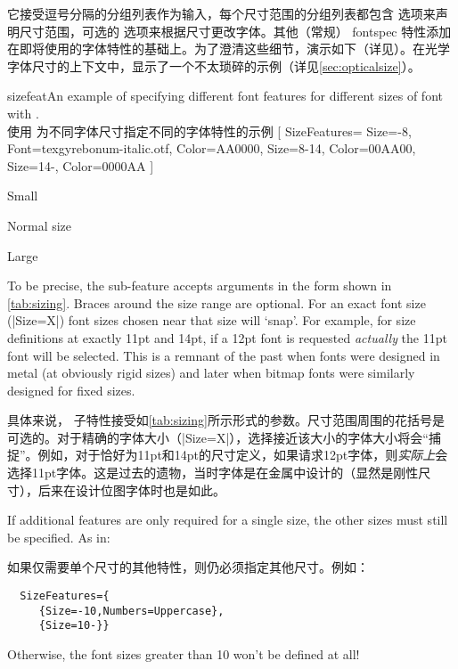 \documentclass[a4paper]{l3doc}
\begin{document}
它接受逗号分隔的分组列表作为输入，每个尺寸范围的分组列表都包含  选项来声明尺寸范围，可选的  选项来根据尺寸更改字体。其他（常规） fontspec 特性添加在即将使用的字体特性的基础上。为了澄清这些细节，演示如下（详见）。在光学字体尺寸的上下文中，显示了一个不太琐碎的示例（详见\vref{sec:opticalsize}）。


\begin{Xexample}{sizefeat}{An example of specifying different font features for different sizes of font with .\\使用  为不同字体尺寸指定不同的字体特性的示例}
  [
    SizeFeatures={
      {Size={-8}, Font=texgyrebonum-italic.otf, Color=AA0000},
      {Size={8-14}, Color=00AA00},
      {Size={14-}, Color=0000AA}} ]

  {\scriptsize Small\par} Normal size\par {\Large Large\par}
\end{Xexample}

To be precise, the  sub-feature accepts arguments in the form shown in \vref{tab:sizing}.
Braces around the size range are optional. For an exact font size (|Size=X|)
font sizes chosen near that size will `snap'. For example, for size definitions
at exactly 11pt and 14pt, if a 12pt font is requested \emph{actually} the
11pt font will be selected. This is a remnant of the past when fonts were designed
in metal (at obviously rigid sizes) and later when bitmap fonts were similarly
designed for fixed sizes.

具体来说， 子特性接受如\vref{tab:sizing}所示形式的参数。尺寸范围周围的花括号是可选的。对于精确的字体大小（|Size=X|），选择接近该大小的字体大小将会“捕捉”。例如，对于恰好为11pt和14pt的尺寸定义，如果请求12pt字体，则\emph{实际上}会选择11pt字体。这是过去的遗物，当时字体是在金属中设计的（显然是刚性尺寸），后来在设计位图字体时也是如此。

If additional features are only required for a single size, the other sizes
must still be specified.  As in:

如果仅需要单个尺寸的其他特性，则仍必须指定其他尺寸。例如：
\begin{Verbatim}
  SizeFeatures={
     {Size=-10,Numbers=Uppercase},
     {Size=10-}}
\end{Verbatim}
Otherwise, the font sizes greater than 10 won't be defined at all!
\end{document}

